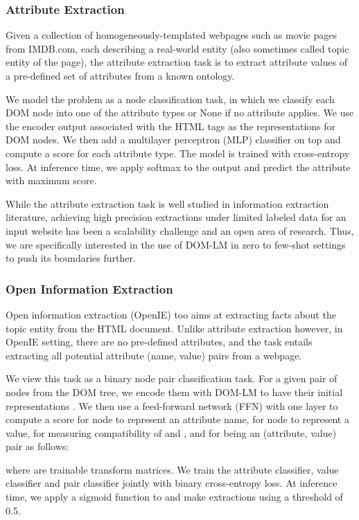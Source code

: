 \documentclass[sigconf, nonacm]{acmart}
\newcommand{\ours}[0]{DOM-LM}
\begin{document}
\subsubsection{Attribute Extraction}
Given a collection of homogeneously-templated webpages such as movie pages from IMDB.com, each describing a real-world entity (also sometimes called topic entity of the page), the attribute extraction task is to extract attribute values of a pre-defined set of attributes from a known ontology. 


We model the problem as a node classification task, in which we classify each DOM node into one of the attribute types or None if no attribute applies. 
We use the encoder output  associated with the HTML tags as the representations for DOM nodes. We then add a multilayer perceptron (MLP) classifier on top and compute a score  for each attribute type. The model is trained with cross-entropy loss. At inference time, we apply softmax to the output and predict the attribute with maximum score. 

While the attribute extraction task is well studied in information extraction literature, achieving high precision extractions under limited labeled data for an input website has been a scalability challenge and an open area of research. Thus, we are specifically interested in the use of \ours{} in zero to few-shot settings to push its boundaries further.

\subsubsection{Open Information Extraction}
Open information extraction (OpenIE) too aims at extracting facts about the topic entity from the HTML document. Unlike attribute extraction however, in OpenIE setting, there are no pre-defined attributes, and the task entails extracting all potential attribute (name, value) pairs from a webpage. 

We view this task as a binary node pair classification task. For a given pair of nodes  from the DOM tree, we encode them with \ours{} to have their initial representations . We then use a feed-forward network (FFN) with one layer to compute a score  for node  to represent an attribute name,  for node  to represent a value,  for measuring compatibility of  and , and  for  being an (attribute, value) pair as follows:

where  are trainable transform matrices. We train the attribute classifier, value classifier and pair classifier jointly with binary cross-entropy loss. At inference time, we apply a sigmoid function to  and make extractions using a threshold of 0.5.
\end{document}
